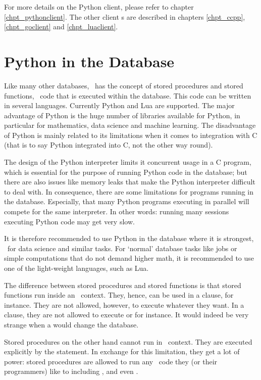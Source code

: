 For more details on the Python client,
please refer to chapter \ref{chpt_pythonclient}.
The other client s are described
in chapters \ref{chpt_ccpp}, \ref{chpt_goclient} and
\ref{chpt_luaclient}.

\section{Python in the Database}
Like many other databases,
\nowdb\ has the concept of
stored procedures and stored functions,
\ie\ code that is executed within the database.
This code can be written in several languages.
Currently Python and Lua are supported.
The major advantage of Python is the huge
number of libraries available for Python,
in particular for mathematics,
data science and machine learning.
The disadvantage of Python is mainly
related to its limitations when it comes
to integration with C (that is to say
Python integrated into C, not the other way round).

The design of the Python interpreter limits
it concurrent usage in a C program, which is essential
for the purpose of running Python code in the database;
but there are also issues like memory leaks
that make the Python interpreter difficult to deal with.
In consequence, there are some limitations
for programs running in the database.
Especially, that many Python programs executing
in parallel will compete for the same interpreter.
In other words: running many sessions executing
Python code may get very slow.

It is therefore recommended to use Python
in the database where it is strongest,
\ie\ for data science and similar tasks.
For `normal' database tasks like 
jobs or simple computations that do not demand
higher math, it is recommended to use one of
the light-weight languages, such as Lua.

The difference between stored procedures
and stored functions is that stored functions
run inside an \sql\ context. They, hence,
can be used in a  clause,
for instance. They are not allowed, however,
to execute whatever they want.
In a  clause,
they are not allowed to
execute  or  for instance.
It would indeed be very strange when
a  would change the database.

Stored procedures on the other hand
cannot run in \sql\ context. They are
executed explicitly by the 
statement. In exchange for this limitation,
they get a lot of power:
stored procedures are allowed to run
any \sql\ code they (or their programmers)
like to including , 
and even .

